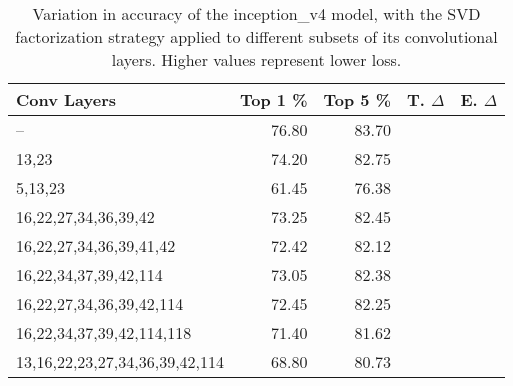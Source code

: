 \begin{table}
\centering
\begin{tabular}{|l|r|r|r|r|}
\hline
Conv Layers & Top 1 \% & Top 5 \% & T. $\Delta$ & E. $\Delta$ \\\hline
-- & 76.80 & 83.70 &  & \\\hline
13,23 & 74.20 & 82.75 &  &  \\\hline
5,13,23 & 61.45 & 76.38 &  &  \\\hline
16,22,27,34,36,39,42 & 73.25 & 82.45 &  &  \\\hline
16,22,27,34,36,39,41,42 & 72.42 & 82.12 &  &  \\\hline
16,22,34,37,39,42,114 & 73.05 & 82.38 &  &  \\\hline
16,22,27,34,36,39,42,114 & 72.45 & 82.25 &  &  \\\hline
16,22,34,37,39,42,114,118 & 71.40 & 81.62 &  &  \\\hline
13,16,22,23,27,34,36,39,42,114 & 68.80 & 80.73 &  &  \\\hline
\end{tabular}
\caption{Variation in accuracy of the inception\_v4 model, with the SVD factorization strategy applied to different subsets of its convolutional layers. Higher values represent lower loss.}
\label{inception_v4-accuracy}
\end{table}
